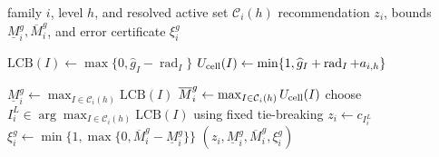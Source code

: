 \begin{algorithm}[t]
\caption{Construct a within-family certificate}
\label{alg:vs-family-certificate}
\small
\begin{algorithmic}[1]
\Require family $i$, level $h$, and resolved active set $\mathcal C_i(h)$
\Ensure recommendation $z_i$, bounds $\underline M_i^g,\overline M_i^g$,
and error certificate $\xi_i^g$

    \State $\mathrm{LCB}(I)\gets
    \max\{0,\widehat g_I-\operatorname{rad}_I\}$
    \State $U_{\rm cell}(I)\gets
    \min\{1,\widehat g_I+\operatorname{rad}_I+a_{i,h}\}$
\EndFor

\State $\underline M_i^g\gets
\max_{I\in\mathcal C_i(h)}\mathrm{LCB}(I)$
\State $\overline M_i^g\gets
\max_{I\in\mathcal C_i(h)}U_{\rm cell}(I)$
\State choose $I_i^L\in\arg\max_{I\in\mathcal C_i(h)}\mathrm{LCB}(I)$
using fixed tie-breaking
\State $z_i\gets c_{I_i^L}$
\State $\xi_i^g\gets
\min\{1,\max\{0,\overline M_i^g-\underline M_i^g\}\}$
\State \Return $(z_i,\underline M_i^g,\overline M_i^g,\xi_i^g)$
\end{algorithmic}
\end{algorithm}
